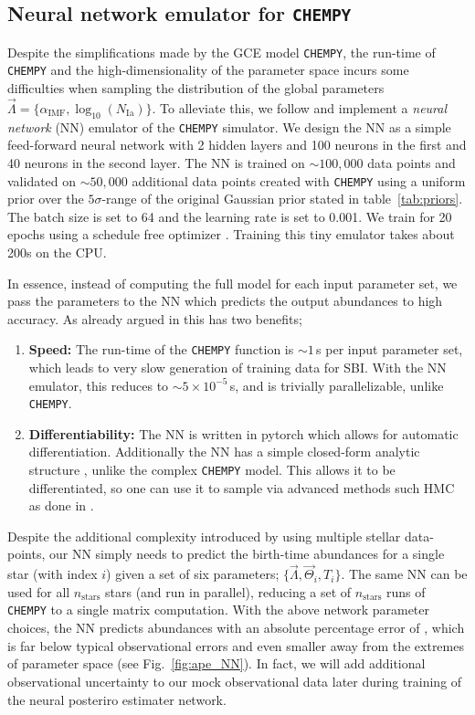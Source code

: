 \documentclass{aa}
\begin{document}
\subsection{Neural network emulator for \texttt{CHEMPY}}
Despite the simplifications made by the GCE model \texttt{CHEMPY}, the run-time of \texttt{CHEMPY} and the high-dimensionality of the parameter space incurs some difficulties when sampling the distribution of the global parameters $\vec\Lambda = \{\alpha_\mathrm{IMF},\log_{10}(N_\mathrm{Ia})\}$. 
To alleviate this, we follow \cite{Philcox_2019} and implement a \textit{neural network} (NN) emulator of the \texttt{CHEMPY} simulator. We design the NN as a simple feed-forward neural network with 2 hidden layers and 100 neurons in the first and 40 neurons in the second layer. The NN is trained on $\sim100,000$ data points and validated on $\sim50,000$ additional data points created with \texttt{CHEMPY} using a uniform prior over the $5\sigma$-range of the original Gaussian prior stated in table~\ref{tab:priors}. The batch size is set to 64 and the learning rate is set to 0.001. We train for 20 epochs using a schedule free optimizer \citep{schedulefree}. 
Training this tiny emulator takes about 200s on the CPU.

In essence, instead of computing the full model for each input parameter set, we pass the parameters to the NN which predicts the output abundances to high accuracy. As already argued in \cite{Philcox_2019} this has two benefits;
\begin{enumerate}
    \item \textbf{Speed:} The run-time of the \texttt{CHEMPY} function is $\sim1$\,s per input parameter set, which leads to very slow generation of training data for SBI. With the NN emulator, this reduces to $\sim5\times10^{-5}$\,s, and is trivially parallelizable, unlike \texttt{CHEMPY}.
    \item \textbf{Differentiability:} The NN is written in pytorch which allows for automatic differentiation. Additionally the NN has a simple closed-form analytic structure \citep[described in the appendix of][]{Philcox_2019}, unlike the complex \texttt{CHEMPY} model. This allows it to be differentiated, so one can use it to sample via advanced methods such HMC as done in \citep{Philcox_2019}.
\end{enumerate}

Despite the additional complexity introduced by using multiple stellar data-points, our NN simply needs to predict the birth-time abundances for a single star (with index $i$) given a set of six parameters; $\{\vec\Lambda,\vec\Theta_i,T_i\}$. The same NN can be used for all $n_\mathrm{stars}$ stars (and run in parallel), reducing a set of $n_\mathrm{stars}$ runs of \texttt{CHEMPY} to a single matrix computation. With the above network parameter choices, the NN predicts abundances with an absolute percentage error of , which is far below typical observational errors and even smaller away from the extremes of parameter space (see Fig.~\ref{fig:ape_NN}). In fact, we will add additional observational uncertainty to our mock observational data later during training of the neural posteriro estimater network. 
\end{document}
